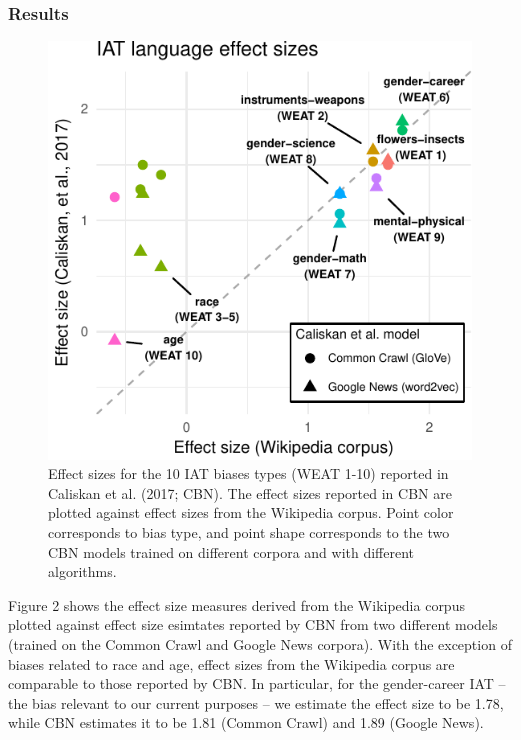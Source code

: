 \documentclass[10pt, letterpaper]{article}
\newenvironment{CodeChunk}{}{}
\begin{document}
\subsubsection{Results}\label{results-1}

\begin{CodeChunk}
\begin{figure}[t]

{\centering \includegraphics{figs/WEAT_plot-1} 

}

\caption[Effect sizes for the 10 IAT biases types (WEAT 1-10) reported in Caliskan et al]{Effect sizes for the 10 IAT biases types (WEAT 1-10) reported in Caliskan et al. (2017; CBN). The effect sizes reported in CBN are plotted against  effect sizes from the Wikipedia corpus.  Point color corresponds to  bias type, and point shape corresponds to the two CBN models trained on different corpora and with different algorithms.}\label{fig:WEAT_plot}
\end{figure}
\end{CodeChunk}

Figure 2 shows the effect size measures derived from the Wikipedia
corpus plotted against effect size esimtates reported by CBN from two
different models (trained on the Common Crawl and Google News corpora).
With the exception of biases related to race and age, effect sizes from
the Wikipedia corpus are comparable to those reported by CBN. In
particular, for the gender-career IAT -- the bias relevant to our
current purposes -- we estimate the effect size to be 1.78, while CBN
estimates it to be 1.81 (Common Crawl) and 1.89 (Google News).
\end{document}

